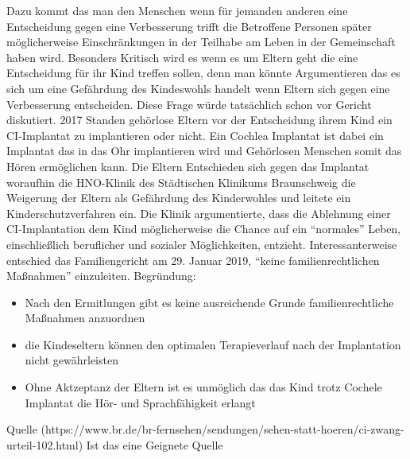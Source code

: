 \documentclass[a4paper,
DIV=13,
12pt,
BCOR=10mm,
department=FakEI,
twoside,
parskip=half,
automark,
]{OTHRartcl}
\begin{document}
Dazu kommt das man den Menschen wenn für jemanden anderen eine Entscheidung gegen eine Verbesserung trifft die Betroffene Personen später  möglicherweise Einschränkungen in der 
Teilhabe am Leben in der Gemeinschaft haben wird. Besonders Kritisch wird es wenn es um Eltern geht die eine Entscheidung für ihr Kind treffen sollen, denn man könnte Argumentieren 
das es sich um eine Gefährdung des Kindeswohls handelt wenn Eltern sich gegen eine Verbesserung entscheiden.
Diese Frage würde tatsächlich schon vor Gericht diskutiert. 2017 Standen gehörlose Eltern vor der Entscheidung ihrem Kind ein CI-Implantat zu implantieren oder nicht. Ein Cochlea 
Implantat ist dabei ein Implantat das in das Ohr implantieren wird und Gehörlosen Menschen somit das Hören ermöglichen kann. Die Eltern Entschieden sich gegen das Implantat
woraufhin die HNO-Klinik des Städtischen Klinikums Braunschweig  die Weigerung der Eltern als Gefährdung des Kinderwohles und leitete ein Kinderschutzverfahren ein. 
Die Klinik argumentierte, dass die Ablehnung einer CI-Implantation dem Kind möglicherweise die Chance auf ein ``normales'' Leben, einschließlich beruflicher und 
sozialer Möglichkeiten, entzieht. Interessanterweise entschied das Familiengericht am 29. Januar 2019, ``keine familienrechtlichen Maßnahmen'' einzuleiten. 
Begründung:
\begin{itemize}
    \item Nach den Ermitlungen gibt es keine ausreichende Grunde familienrechtliche Maßnahmen anzuordnen
    \item die Kindeseltern können den optimalen Terapieverlauf nach der Implantation nicht gewährleisten
    \item Ohne Aktzeptanz der Eltern ist es unmöglich das das Kind trotz Cochele Implantat die Hör- und Sprachfähigkeit erlangt
\end{itemize}
Quelle (https://www.br.de/br-fernsehen/sendungen/sehen-statt-hoeren/ci-zwang-urteil-102.html) Ist das eine Geignete Quelle
\end{document}

